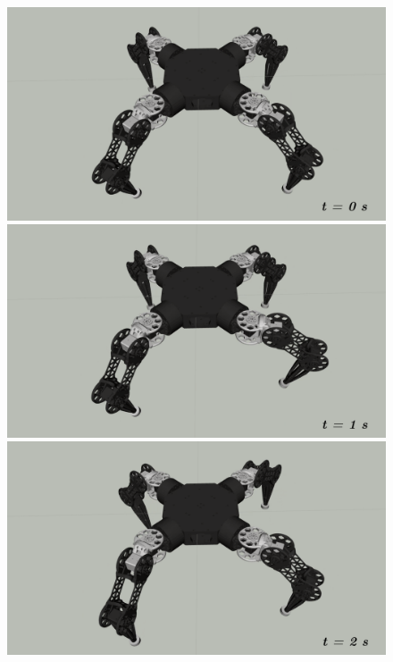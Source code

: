 \begin{figure}[t]
  \centering
  \begin{minipage}[b]{0.32\textwidth}
    \centering
    \includegraphics[clip, width=\linewidth]{./fig/chap4/gait/crawl/c_zmp1.png}
  \end{minipage}
  \begin{minipage}[b]{0.32\textwidth}
    \centering
    \includegraphics[clip, width=\textwidth]{./fig/chap4/gait/crawl/c_step1.png}
  \end{minipage}
  \begin{minipage}[b]{0.32\textwidth}
    \centering
    \includegraphics[clip, width=\textwidth]{./fig/chap4/gait/crawl/c_step2.png}

\end{minipage}
\end{figure}
